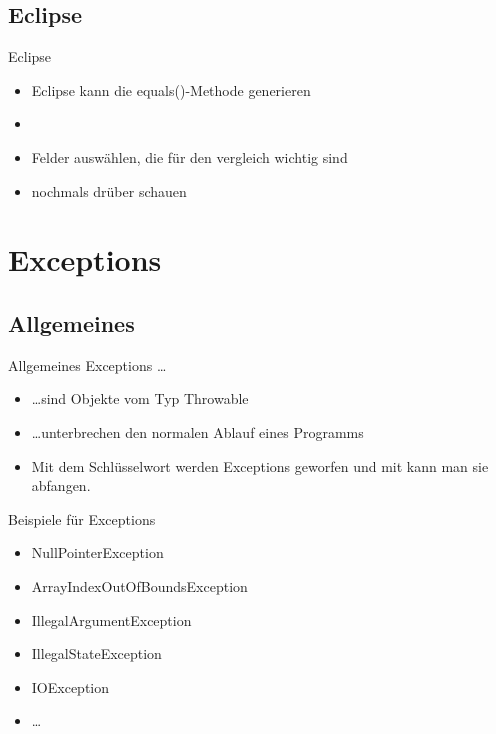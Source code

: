 \documentclass[usepdftitle=false,hyperref={pdfpagelabels=false}]{beamer}
\begin{document}
\subsection{Eclipse}
\begin{frame}{Eclipse}
    \begin{itemize}
        \item Eclipse kann die equals()-Methode generieren
        \item {}
        \item Felder auswählen, die für den vergleich wichtig sind
        \item nochmals drüber schauen
    \end{itemize}
\end{frame}

\section{Exceptions}
\subsection{Allgemeines}
\begin{frame}{Allgemeines}
    Exceptions \dots
    \begin{itemize}[<+->]
        \item \dots sind Objekte vom Typ Throwable
        \item \dots unterbrechen den normalen Ablauf eines Programms
        \item Mit dem Schlüsselwort  werden Exceptions
              geworfen und mit  kann man sie abfangen.
    \end{itemize}

    \pause[\thebeamerpauses]

    \begin{exampleblock}{Beispiele für Exceptions}
        \begin{itemize}
            \item NullPointerException
            \item ArrayIndexOutOfBoundsException
            \item IllegalArgumentException
            \item IllegalStateException
            \item IOException
            \item \dots
        \end{itemize}
    \end{exampleblock}
\end{frame}
\end{document}
